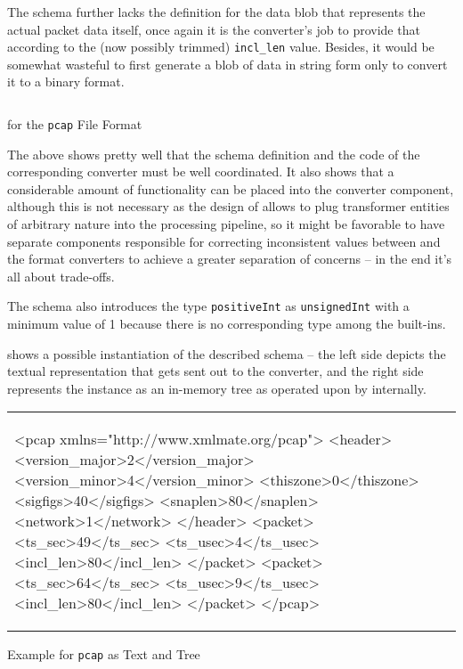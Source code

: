 The schema further lacks the definition for the data blob that represents the actual packet data itself, once
again it is the converter's job to provide that according to the (now possibly trimmed) \texttt{incl\_len}
value. Besides, it would be somewhat wasteful to first generate a blob of data in string form only to 
convert it to a binary format.

\begin{listing}[htp]
\centering
\inputminted[frame=lines,fontsize=\small]{xml}{../subjects/pcap/schema/pcap.xsd}
\caption{\xsd for the \texttt{pcap} File Format}
\label{lst:xsdexample}
\end{listing}

The above shows pretty well that the schema definition and the code of the corresponding converter
must be well coordinated. It also shows that a considerable amount of functionality can be placed into the
converter component, although this is not necessary as the design of \xmlmate allows to plug transformer
entities of arbitrary nature into the processing pipeline, so it might be favorable to have separate
components responsible for correcting inconsistent values between \xmlmate and the format converters to achieve
a greater separation of concerns -- in the end it's all about trade-offs.

The schema also introduces the type \texttt{positiveInt} as \texttt{unsignedInt} with a minimum value of 1
because there is no corresponding type among the \xsd built-ins.

 shows a possible instantiation of the described schema -- the left side depicts the
textual representation that gets sent out to the converter, and the right side represents the instance as an
in-memory \xml tree as operated upon by \xmlmate internally.


\begin{listing}[H]
\centering
\begin{tabular}{|m{4.5cm}m{8cm}|}
\begin{xmlcode}
<pcap xmlns="http://www.xmlmate.org/pcap">
	<header>
		<version_major>2</version_major>
		<version_minor>4</version_minor>
		<thiszone>0</thiszone>
		<sigfigs>40</sigfigs>
		<snaplen>80</snaplen>
		<network>1</network>
	</header>
	<packet>
		<ts_sec>49</ts_sec>
		<ts_usec>4</ts_usec>
		<incl_len>80</incl_len>
	</packet>
	<packet>
		<ts_sec>64</ts_sec>
		<ts_usec>9</ts_usec>
		<incl_len>80</incl_len>
	</packet>
</pcap>
\end{xmlcode}
&
\begin{tikzpicture}[grow=right]
\tikzset{level distance=68pt,sibling distance=0pt}
\tikzset{execute at begin node=\strut}
	\Tree [.pcap 
[.packet [.incl\_len 80 ] [.ts\_usec 9 ] [.ts\_sec 64 ] ]
[.packet [.incl\_len 80 ] [.ts\_usec 4 ] [.ts\_sec 49 ] ]
[.header [.network 1 ] [.snaplen 80 ] [.sigfigs 40 ] [.thiszone 0 ] [.version\_minor 4 ] [.version\_major 2 ] ]
]
\end{tikzpicture}
\end{tabular}
\caption{Example \xml for \texttt{pcap} as Text and Tree}
\label{lst:xmlexample}
\end{listing}

